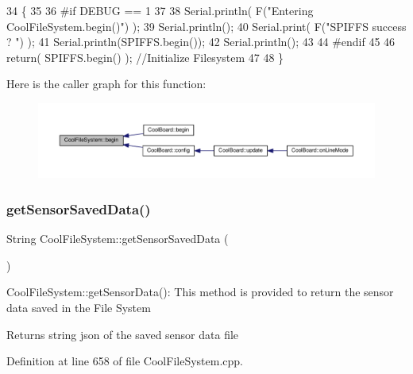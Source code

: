 \begin{DoxyCode}
34 \{
35 
36 \textcolor{preprocessor}{#if DEBUG == 1}
37 
38     Serial.println( F(\textcolor{stringliteral}{"Entering CoolFileSystem.begin()"}) );
39     Serial.println();   
40     Serial.print( F(\textcolor{stringliteral}{"SPIFFS success ? "}) );
41     Serial.println(SPIFFS.begin());
42     Serial.println();
43 
44 \textcolor{preprocessor}{#endif}
45 
46     \textcolor{keywordflow}{return}( SPIFFS.begin() );                                   \textcolor{comment}{//Initialize Filesystem}
47 
48 \}
\end{DoxyCode}
Here is the caller graph for this function\+:\nopagebreak
\begin{figure}[H]
\begin{center}
\leavevmode
\includegraphics[width=350pt]{classCoolFileSystem_a6ba6f666ed4c530174f8569d2c636748_icgraph}
\end{center}
\end{figure}
\mbox{\label{classCoolFileSystem_a5c58bca3735c0ed3efb268d70ef998ef}} 
\subsubsection{\texorpdfstring{get\+Sensor\+Saved\+Data()}{getSensorSavedData()}}
{\footnotesize\ttfamily String Cool\+File\+System\+::get\+Sensor\+Saved\+Data (\begin{DoxyParamCaption}{ }\end{DoxyParamCaption})}

Cool\+File\+System\+::get\+Sensor\+Data()\+: This method is provided to return the sensor data saved in the File System

\begin{DoxyReturn}{Returns}
string json of the saved sensor data file 
\end{DoxyReturn}


Definition at line 658 of file Cool\+File\+System.\+cpp.



